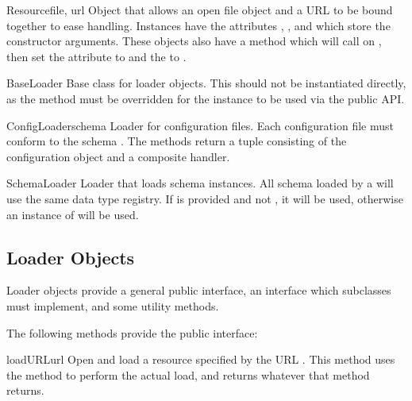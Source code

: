 \documentclass{howto}
\begin{document}
\begin{classdesc}{Resource}{file, url}
  Object that allows an open file object and a URL to be bound
  together to ease handling.  Instances have the attributes
  , , and  which store the
  constructor arguments.  These objects also have a 
  method which will call  on , then set the
   attribute to  and the  to
  .
\end{classdesc}

\begin{classdesc}{BaseLoader}{}
  Base class for loader objects.  This should not be instantiated
  directly, as the  method must be overridden
  for the instance to be used via the public API.
\end{classdesc}

\begin{classdesc}{ConfigLoader}{schema}
  Loader for configuration files.  Each configuration file must
  conform to the schema .  The  methods
  return a tuple consisting of the configuration object and a
  composite handler.
\end{classdesc}

\begin{classdesc}{SchemaLoader}{}
  Loader that loads schema instances.  All schema loaded by a
   will use the same data type registry.  If
   is provided and not , it will be used,
  otherwise an instance of  will be
  used.
\end{classdesc}


\subsection{Loader Objects}

Loader objects provide a general public interface, an interface which
subclasses must implement, and some utility methods.

The following methods provide the public interface:

\begin{methoddesc}[loader]{loadURL}{url}
  Open and load a resource specified by the URL .
  This method uses the  method to perform the
  actual load, and returns whatever that method returns.
\end{methoddesc}
\end{document}
